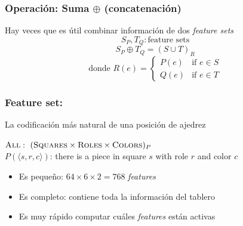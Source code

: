\begin{frame}
\frametitle{Operación: Suma $\oplus$ (concatenación)}
Hay veces que es útil combinar información de dos \textit{feature sets} \\
\pause
\begin{equation*}
S_P, T_Q: \text{feature sets}
\end{equation*}
\begin{equation*}
S_P \oplus T_Q = {(S \cup T)}_R
\end{equation*}
\begin{equation*}
    \text{donde } R(e) = \begin{cases}
        P(e) & \text{if } e \in S \\
        Q(e) & \text{if } e \in T
    \end{cases}
\end{equation*}
\end{frame}


\begin{frame}
\frametitle{Feature set: }
La codificación más natural de una posición de ajedrez \\
\begin{center}
    $\textsc{All}:\ (\textsc{Squares} \times \textsc{Roles} \times \textsc{Colors})_{P}$ \\
    $P(\langle s, r, c \rangle)$: there is a piece in square $s$ with role $r$ and color $c$\\
\end{center}
\pause
\begin{itemize}
    \item<2-> Es pequeño: $64 \times 6 \times 2 = 768$ \textit{features}
    \item<3-> Es completo: contiene toda la información del tablero
    \item<4-> Es muy rápido computar cuáles \textit{features} están activas
\end{itemize}
\end{frame}

